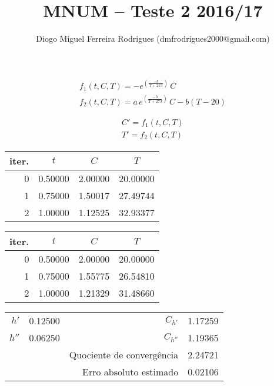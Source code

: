 \documentclass{mnum}
\title{MNUM -- Teste 2 2016/17}
\author{Diogo Miguel Ferreira Rodrigues (dmfrodrigues2000@gmail.com)}
\begin{document}
\setcounter{chapter}{15}

\begin{center}
\begin{minipage}[c]{0.5\textwidth}
\begin{gather*}
	f_1(t,C,T) = -e^{\left(\frac{-b}{T+273}\right)}\,C\\
	f_2(t,C,T) = a\,e^{\left(\frac{-b}{T+273}\right)}\,C -b(T-20)
\end{gather*}
\end{minipage}%
\begin{minipage}[c]{0.5\textwidth}
\begin{gather*}
	C' = f_1(t,C,T)\\
	T' = f_2(t,C,T)
\end{gather*}
\end{minipage}
\end{center}
%
\begin{center}
\begin{minipage}[c]{0.5\textwidth}
\begin{center}\begin{tabular}{r | c c c}
	iter. & $t$ & $C$ & $T$ \\ \hline
	0     & 0.50000 & 2.00000 & 20.00000 \\
	1     & 0.75000 & 1.50017 & 27.49744 \\
	2     & 1.00000 & 1.12525 & 32.93377
\end{tabular} \end{center}
\end{minipage}%
\begin{minipage}[c]{0.5\textwidth}
\begin{center}\begin{tabular}{r | c c c}
	iter. & $t$ & $C$ & $T$ \\ \hline
	0     & 0.50000 & 2.00000 & 20.00000 \\
	1     & 0.75000 & 1.55775 & 26.54810 \\
	2     & 1.00000 & 1.21329 & 31.48660
\end{tabular} \end{center}
\end{minipage}
\end{center}
\begin{center} \begin{tabular}{ r | c || r | c}
	$h' $ & 0.12500 & $C_{h'} $ & 1.17259 \\
	$h''$ & 0.06250 & $C_{h''}$ & 1.19365 \\
	      &         & Quociente de convergência & 2.24721 \\
	      &         & Erro absoluto estimado & 0.02106
\end{tabular} \end{center}
\end{document}
